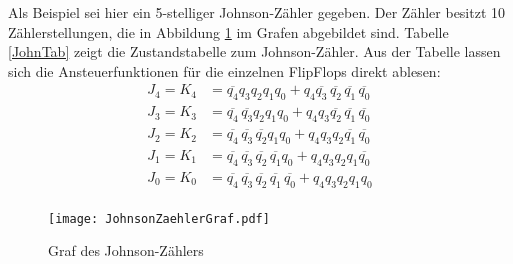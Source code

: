 Als Beispiel sei hier ein 5-stelliger Johnson-Zähler gegeben. Der Zähler besitzt 10 Zählerstellungen, die in Abbildung \ref{JohnZae} im Grafen abgebildet sind. Tabelle \ref{JohnTab} zeigt die Zustandstabelle zum Johnson-Zähler.
Aus der Tabelle lassen sich die Ansteuerfunktionen für die einzelnen FlipFlops direkt ablesen:
\begin{align*}
	J_4 = K_4 &= \overline{q_4} q_3 q_2 q_1 q_0 + q_4 \overline{q_3} \hspace{2pt} \overline{q_2} \hspace{2pt} \overline{q_1} \hspace{2pt} \overline{q_0} \\
	J_3 = K_3 &= \overline{q_4} \hspace{2pt} \overline{q_3} q_2 q_1 q_0 + q_4 q_3 \overline{q_2} \hspace{2pt} \overline{q_1} \hspace{2pt} \overline{q_0} \\
	J_2 = K_2 &= \overline{q_4} \hspace{2pt} \overline{q_3} \hspace{2pt} \overline{q_2} q_1 q_0 + q_4 q_3 q_2 \overline{q_1} \hspace{2pt} \overline{q_0}  \\
	J_1 = K_1 &= \overline{q_4} \hspace{2pt} \overline{q_3} \hspace{2pt} \overline{q_2} \hspace{2pt} \overline{q_1} q_0 + q_4 q_3 q_2 q_1 \overline{q_0} \\
	J_0	= K_0 &= \overline{q_4} \hspace{2pt} \overline{q_3} \hspace{2pt} \overline{q_2} \hspace{2pt} \overline{q_1} \hspace{2pt} \overline{q_0} + q_4 q_3 q_2 q_1 q_0 \\ 
\end{align*}

\begin{figure}[htp]
	\centering
	\texttt{[image: JohnsonZaehlerGraf.pdf]}
	\caption{Graf des Johnson-Zählers}
	\label{JohnZae}
\end{figure}

